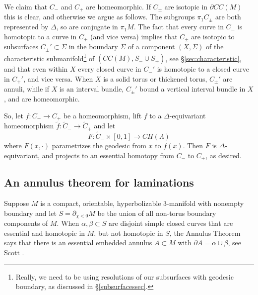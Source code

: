 \documentclass[12pt]{amsart}
\theoremstyle{definition}
\theoremstyle{remark}
\begin{document}
We claim that $C_-$ and $C_+$ are homeomorphic. If $C_\pm$ are isotopic in $\partial CC(M)$ this is clear, and otherwise we argue as follows. The subgroups $\pi_1 C_\pm$ are both represented by $\Delta$, so are conjugate in $\pi_1 M$. The fact that every curve in $C_-$ is homotopic to a curve in $C_+$ (and vice versa) implies that $C_\pm$ are isotopic to subsurfaces $C_\pm' \subset \Sigma$ in the boundary $\Sigma$ of a component $(X,\Sigma)$ of the characteristic submanifold\footnote{Really, we need to be using resolutions of our subsurfaces with geodesic boundary, as discussed in \S \ref{subsurfacessec}.} of $(CC(M),S_-\cup S_+)$, see \S\ref{sec:characteristic}, and that even within $X$ every closed curve in $C_-'$ is homotopic to a closed curve in $C_+'$, and vice versa. When $X$ is a solid torus or thickened torus, $C_\pm'$ are annuli, while if $X$ is an interval bundle, $C_\pm'$ bound a vertical interval bundle in $X$, and are homeomorphic.

So, let $f : C_- \longrightarrow C_+$ be a homeomorphism, lift $f$ to a $\Delta$-equivariant homeomorphism $\tilde f : \tilde C_-\longrightarrow \tilde C_+$ and let  $$F : \tilde C_-\times [0,1] \longrightarrow CH(\Lambda)$$
where $F(x,\cdot)$ parametrizes the geodesic from $x$ to $f(x)$. Then $F$ is $\Delta$-equivariant, and projects to an essential homotopy from $C_-$ to $C_+$, as desired.%




\subsection {An annulus theorem for laminations}
\label {annulussec}
Suppose $M $ is a compact, orientable, hyperbolizable $3$-manifold with nonempty  boundary and let $S = \partial_{\chi<0} M$ be the union of all non-torus boundary components of $M$. When $\alpha,\beta \subset S $ are disjoint simple closed curves that are essential and homotopic in $M $, but not homotopic in $S $, the Annulus Theorem says that there is an essential embedded annulus $A\subset M $ with $\partial A =\alpha \cup \beta $, see Scott \cite{Scottstrong}. 
\end{document}
